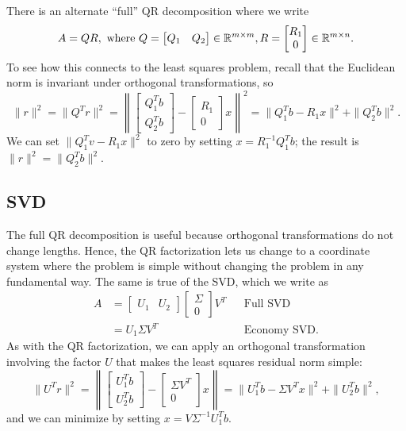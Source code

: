 \documentclass[12pt, leqno]{article}
\begin{document}
There is an alternate ``full'' QR decomposition where we write
\[
A = QR, \mbox{ where }
Q = \begin{bmatrix} Q_1 & Q_2 \end{bmatrix} \in \mathbb{R}^{m \times m},
R = \begin{bmatrix} R_{1} \\ 0 \end{bmatrix} \in \mathbb{R}^{m \times n}.
\]
To see how this connects to the least squares problem, recall
that the Euclidean norm is invariant under orthogonal transformations,
so
\[
  \|r\|^2 = \|Q^T r\|^2 = \left\| \begin{bmatrix} Q_1^T b \\ Q_2^T
    b \end{bmatrix} - \begin{bmatrix} R_1 \\ 0 \end{bmatrix} x
  \right\|^2 = \|Q_1^T b-R_1x\|^2 + \|Q_2^T b\|^2.
\]
We can set $\|Q_1^T v-R_1 x\|^2$ to zero by
setting $x = R_1^{-1} Q_1^T b$; the result is
$\|r\|^2 = \|Q_2^T b\|^2$.

\subsection{SVD}

The full QR decomposition is useful because orthogonal transformations
do not change lengths.  Hence, the QR factorization lets us change
to a coordinate system where the problem is simple without changing
the problem in any fundamental way.  The same is true of the SVD,
which we write as
\begin{align*}
A &=
\begin{bmatrix} U_1 & U_2 \end{bmatrix}
\begin{bmatrix} \Sigma \\ 0 \end{bmatrix}
V^T & & \mbox{Full SVD} \\
&= U_1 \Sigma V^T & & \mbox{Economy SVD}.
\end{align*}
As with the QR factorization, we can apply an orthogonal
transformation involving the factor $U$ that makes the
least squares residual norm simple:
\[
\|U^T r\|^2 =
\left\| \begin{bmatrix} U_1^T b \\ U_2^T b \end{bmatrix} -
\begin{bmatrix} \Sigma V^T \\ 0 \end{bmatrix} x
\right\| =
\|U_1^T b - \Sigma V^T x\|^2 + \|U_2^T b\|^2,
\]
and we can minimize by setting $x = V \Sigma^{-1} U_1^T b$.
\end{document}

